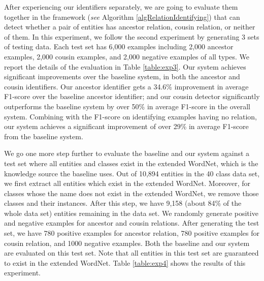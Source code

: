 After experiencing our identifiers separately, we are going to evaluate them together in the framework ({\em see} Algorithm \ref{algRelationIdentifying}) that can detect whether a pair of entities has ancestor relation, cousin relation, or neither of them.  In this experiment, we follow the second experiment by generating 3 sets of testing data. Each test set has 6,000 examples including 2,000 ancestor examples, 2,000 cousin examples, and 2,000 negative examples of all types. We report the details of the evaluation in Table \ref{table:exp3}.
Our system achieves significant improvements over the baseline system, in both the ancestor and cousin identifiers. Our ancestor identifier gets a 34.6\% improvement in average F1-score over the baseline ancestor identifier; and our cousin detector significantly outperforms the baseline system by over 50\% in average F1-score in the overall system. Combining with the F1-score on identifying examples having no relation, our system achieves a significant improvement of over 29\% in average F1-score from the baseline system.

We go one more step further to evaluate the baseline and our system against a test set where all entities and classes exist in the extended WordNet, which is the knowledge source the baseline uses. Out of 10,894 entities in the 40 class data set, we first extract all entities which exist in the extended WordNet. Moreover, for classes whose the name does not exist in the extended WordNet, we remove those classes and their instances. After this step, we have 9,158 (about 84\% of the whole data set) entities remaining in the data set. We randomly generate positive and negative examples for ancestor and cousin relations. After generating the test set, we have 780 positive examples for ancestor relation, 780 positive examples for cousin relation, and 1000 negative examples.
Both the baseline and our system are evaluated on this test set. Note that all entities in this test set are guaranteed to exist in the extended WordNet. Table \ref{table:exp4} shows the results of this experiment.

